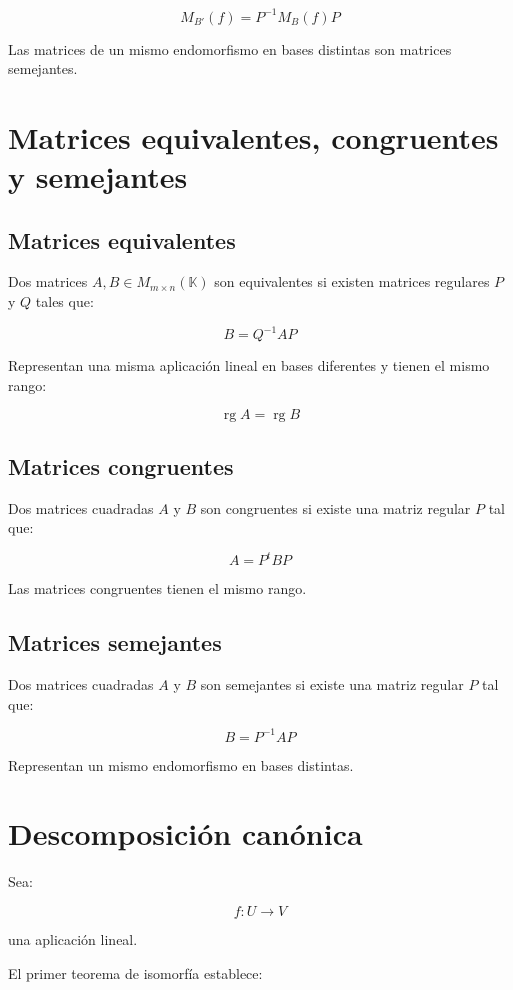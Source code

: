 \documentclass[11pt,a4paper]{article}
\newcommand{\K}{\mathbb{K}}
\newcommand{\rg}{\operatorname{rg}}
\begin{document}
\[
\boxed{
M_{B'}(f)
=
P^{-1}M_B(f)P
}
\]

Las matrices de un mismo endomorfismo en bases distintas son matrices semejantes.

\section{Matrices equivalentes, congruentes y semejantes}

\subsection{Matrices equivalentes}

Dos matrices $A,B\in M_{m\times n}(\K)$ son equivalentes si existen matrices regulares $P$ y $Q$ tales que:

\[
B=Q^{-1}AP
\]

Representan una misma aplicación lineal en bases diferentes y tienen el mismo rango:

\[
\boxed{
\rg A=\rg B
}
\]

\subsection{Matrices congruentes}

Dos matrices cuadradas $A$ y $B$ son congruentes si existe una matriz regular $P$ tal que:

\[
\boxed{
A=P^tBP
}
\]

Las matrices congruentes tienen el mismo rango.

\subsection{Matrices semejantes}

Dos matrices cuadradas $A$ y $B$ son semejantes si existe una matriz regular $P$ tal que:

\[
\boxed{
B=P^{-1}AP
}
\]

Representan un mismo endomorfismo en bases distintas.

\section{Descomposición canónica}

Sea:

\[
f:U\longrightarrow V
\]

una aplicación lineal.

El primer teorema de isomorfía establece:
\end{document}
